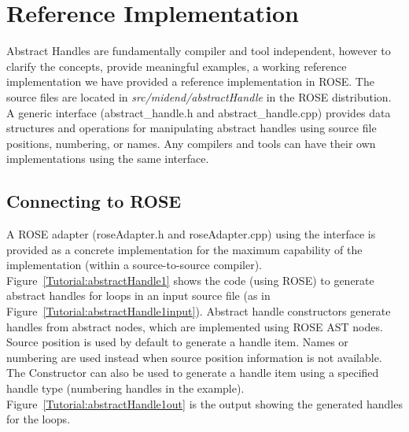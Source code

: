 \section{Reference Implementation}
Abstract Handles are fundamentally compiler and tool independent, however to
clarify the concepts, provide meaningful examples, a working reference 
implementation we have provided a reference implementation in ROSE.
The source files are located in \textit{src/midend/abstractHandle} in the ROSE distribution.
A generic interface (abstract\_handle.h and abstract\_handle.cpp) provides
data structures and operations for manipulating abstract handles using source file
positions, numbering, or names. Any compilers and tools can have their own implementations
using the same interface.

\subsection{Connecting to ROSE}
A ROSE adapter (roseAdapter.h and roseAdapter.cpp) using the interface is
provided as a concrete implementation for the maximum capability of the
implementation (within a source-to-source compiler).
Figure~\ref{Tutorial:abstractHandle1} shows the code (using ROSE) to generate abstract
handles for loops in an input source file (as in
Figure~\ref{Tutorial:abstractHandle1input}). 
Abstract handle constructors generate handles from abstract nodes, which are implemented
using ROSE AST nodes. Source position is used by default to generate a handle item. 
Names or numbering are used instead when source position information is not available. 
The Constructor can also be used to generate a handle item using a specified handle type
(numbering handles in the example). Figure~\ref{Tutorial:abstractHandle1out} is the output
showing the generated handles for the loops.

